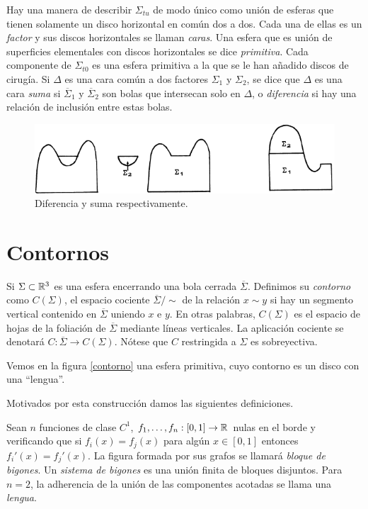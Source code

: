 \documentclass[twoside, 11pt]{article}
\begin{document}
Hay una manera de describir $\Sigma_{tu}$ de modo único como unión de esferas que tienen solamente un disco horizontal en común dos a dos. Cada una de ellas es un \emph{factor} y sus discos horizontales se llaman \emph{caras}. Una esfera que es unión de superficies elementales con discos horizontales se dice \emph{primitiva}. Cada componente de $\Sigma_{t0}$ es una esfera primitiva a la que se le han añadido discos de cirugía. Si $\Delta$ es una cara común a dos factores $\Sigma_1$ y $\Sigma_2$, se dice que $\Delta$ es una cara \emph{suma} si $\overline{\Sigma}_1$ y $\overline{\Sigma}_2$ son bolas que intersecan solo en $\Delta$, o \emph{diferencia} si hay una relación de inclusión entre estas bolas. 

\begin{figure}[h!]
\includegraphics[scale=0.6]{suma}
\caption{Diferencia y suma respectivamente.}
\end{figure}

\section{Contornos}

 Si $\Sigma\subset\mathbb{R}^3$ es una esfera encerrando una bola cerrada $\overline{\Sigma}$. Definimos su \emph{contorno} como $C(\Sigma)$, el espacio cociente $\overline{\Sigma}/\sim$ de la relación $x\sim y$ si hay un segmento vertical contenido en $\overline{\Sigma}$ uniendo $x$ e $y$. En otras palabras, $C(\Sigma)$ es el espacio de hojas de la foliación de $\overline{\Sigma}$ mediante líneas verticales. La aplicación cociente se denotará $C:\overline{\Sigma}\to C(\Sigma)$. Nótese que $C$ restringida a $\Sigma$ es sobreyectiva. 
 

Vemos en la figura \ref{contorno} una esfera primitiva, cuyo contorno es un disco con una ``lengua''.


 

Motivados por esta construcción damos las siguientes definiciones.
 \begin{defi}
 Sean $n$ funciones de clase $C^1$, $f_1,\dots, f_n:[0,1]\to\mathbb{R}$ nulas en el borde y verificando que si $f_i(x)=f_j(x)$ para algún $x\in [0,1]$ entonces $f_i'(x)=f_j'(x)$. La figura formada por sus grafos se llamará \emph{bloque de bigones}. Un \emph{sistema de bigones} es una unión finita de bloques disjuntos. Para $n=2$, la adherencia de la unión de las componentes acotadas se llama una \emph{lengua}. 
 \end{defi}
 
\end{document}
